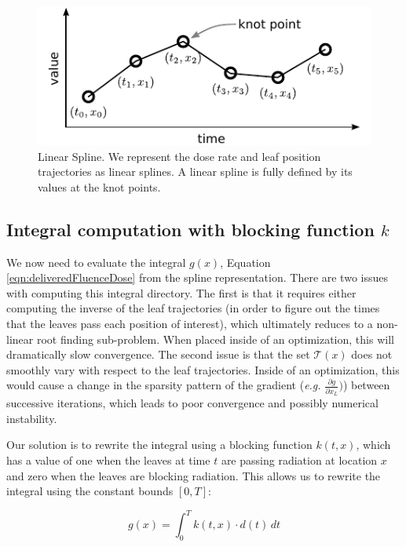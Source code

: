 \documentclass[12pt]{article}
\begin{document}
\begin{figure}
  \centering
  \includegraphics{fig/linearSpline.pdf}
  \caption{Linear Spline. We represent the dose rate and leaf position trajectories as linear splines. A linear spline is fully defined by its values at the knot points. }
  \label{fig:linearSpline}
\end{figure}

\subsection{Integral computation with blocking function $k$}

We now need to evaluate the integral $g(x)$, Equation \ref{eqn:deliveredFluenceDose} from the spline representation.
There are two issues with computing this integral directory.
The first is that it requires either computing the inverse of the leaf trajectories (in order to figure out the times that the leaves pass each position of interest), which
ultimately reduces to a non-linear root finding sub-problem. When placed inside of an optimization, this will dramatically slow convergence.
The second issue is that the set $\mathcal{T}(x)$ does not smoothly vary with respect to the leaf trajectories.
Inside of an optimization, this would cause a change in the sparsity pattern of the gradient
(\textit{e.g.} $\tfrac{\partial g}{\partial x_L})$)
between successive iterations,
which leads to poor convergence and possibly numerical instability.

Our solution is to rewrite the integral using a blocking function $k(t,x)$, which has a value of one when the leaves at time $t$ are passing radiation at location $x$ and zero when the leaves are blocking radiation. This allows us to rewrite the integral using the constant bounds $[0, T]$:

\begin{equation}
  g(x) = \int_0^T \! k(t, x) \cdot d(t) \, dt
  \label{eqn:fluenceDoseSimpleBounds}
\end{equation}
\end{document}

